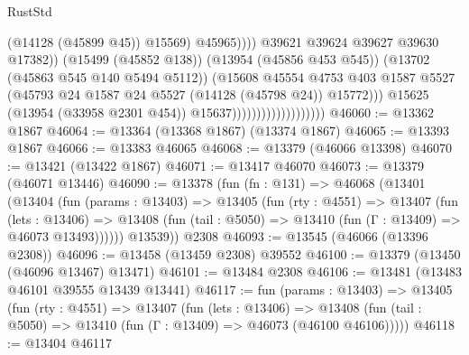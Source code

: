 \begin{lexlean}{RustStd}
\begin{coremodule}
                                                          (@14128 (@45899 @45))
                                                          @15569)
                                                        @45965))))
                                                @39621
                                                @39624
                                                @39627
                                                @39630
                                                @17382))
                                            (@15499 (@45852 @138))
                                            (@13954 (@45856 @453 @545))
                                            (@13702 (@45863 @545 @140 @5494 @5112))
                                            (@15608
                                              @45554
                                              @4753
                                              @403
                                              @1587
                                              @5527
                                              (@45793
                                                @24
                                                @1587
                                                @24
                                                @5527
                                                (@14128 (@45798 @24))
                                                @15772)))
                                          @15625
                                          (@13954 (@33958 @2301 @454))
                                          @15637)))))))))))))))))))
@46060 := @13362 @1867
@46064 := @13364 (@13368 @1867) (@13374 @1867)
@46065 := @13393 @1867
@46066 := @13383 @46065
@46068 := @13379 (@46066 @13398)
@46070 := @13421 (@13422 @1867)
@46071 := @13417 @46070
@46073 := @13379 (@46071 @13446)
@46090 := @13378
    (fun (fn : @131) =>
    @46068
      (@13401
        (@13404
          (fun (params : @13403) =>
          @13405
            (fun (rty : @4551) =>
            @13407
              (fun (lets : @13406) =>
              @13408 (fun (tail : @5050) => @13410 (fun (Γ : @13409) => @46073 @13493))))))
        @13539))
    @2308
@46093 := @13545 (@46066 (@13396 @2308))
@46096 := @13458 (@13459 @2308) @39552
@46100 := @13379 (@13450 (@46096 @13467) @13471)
@46101 := @13484 @2308
@46106 := @13481 (@13483 @46101 @39555 @13439 @13441)
@46117 := fun (params : @13403) =>
  @13405
    (fun (rty : @4551) =>
    @13407
      (fun (lets : @13406) =>
      @13408 (fun (tail : @5050) => @13410 (fun (Γ : @13409) => @46073 (@46100 @46106)))))
@46118 := @13404 @46117

\end{coremodule}
\end{lexlean}
